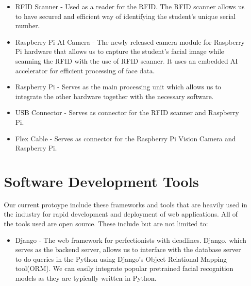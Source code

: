 \begin{itemize}
	\item	RFID Scanner - Used as a reader for the RFID. The RFID scanner allows us to have secured and efficient way of identifying the student's unique serial number.

\end{itemize}

\begin{itemize}
	\item	Raspberry Pi AI Camera - The newly released camera module for Raspberry Pi hardware that allows us to capture the student's facial image while scanning the RFID with the use of RFID scanner. It uses an embedded AI accelerator for efficient processing of face data.
	
\end{itemize} 

\begin{itemize}
	\item	Raspberry Pi - Serves as the main processing unit which allows us to integrate the other hardware together with the necessary software.
	
\end{itemize}

\begin{itemize}
	\item	USB Connector -  Serves as connector for the RFID scanner and Raspberry Pi.
	
\end{itemize}

\begin{itemize}
	\item	Flex Cable -  Serves as connector for the Raspberry Pi Vision Camera and Raspberry Pi. 
	
\end{itemize}
	
\section{Software Development Tools}
\label{sec:devtools}
 Our current protoype include these frameworks and tools that are heavily used in the industry for rapid development and deployment of web applications. All of the tools used are open source. These include but are not limited to:
 
\begin{itemize}
	\item	Django - The web framework for perfectionists with deadlines. Django, which serves as the backend server, allows us to interface with the database server to do queries in the Python using Django's Object Relational Mapping tool(ORM). We can easily integrate popular pretrained facial recognition models as they are typically written in Python.
\end{itemize}


